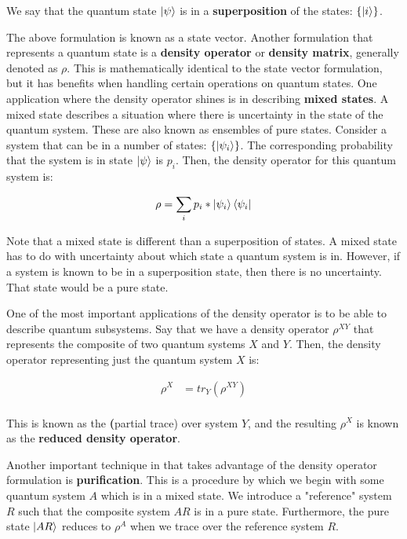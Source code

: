 We say that the quantum state $\ket{\psi}$ is in a \textbf{superposition} of the states: $\{\ket{i}\}$.


The above formulation is known as a state vector. Another formulation that represents a quantum state is a \textbf{density operator} or \textbf{density matrix}, generally denoted as $\rho$. This is mathematically identical to the state vector formulation, but it has benefits when handling certain operations on quantum states. 
One application where the density operator shines is in describing \textbf{mixed states}. A mixed state describes a situation where there is uncertainty in the state of the quantum system. These are also known as ensembles of pure states. Consider a system that can be in a number of states: $\{\ket{\psi_i}\}$. The corresponding probability that the system is in state $\ket{\psi}$ is $p_i$. Then, the density operator for this quantum system is:

\begin{align*}
    \rho &= \sum_{i} p_i * \ket{\psi_i}\bra{\psi_i} \\ 
\end{align*}

Note that a mixed state is different than a superposition of states. A mixed state has to do with uncertainty about which state a quantum system is in. However, if a system is known to be in a superposition state, then there is no uncertainty. That state would be a pure state.

One of the most important applications of the density operator is to be able to describe quantum subsystems. Say that we have a density operator $\rho^{XY}$ that represents the composite of two quantum systems $X$ and $Y$. Then, the density operator representing just the quantum system $X$ is:

\begin{align*}
    \rho^X &= tr_Y(\rho^{XY}) \\ 
\end{align*}

This is known as the \textbf(partial trace) over system $Y$, and the resulting $\rho^X$ is known as the \textbf{reduced density operator}.

Another important technique in that takes advantage of the density operator formulation is \textbf{purification}. This is a procedure by which we begin with some quantum system $A$ which is in a mixed state. We introduce a "reference" system $R$ such that the composite system $AR$ is in a pure state. Furthermore, the pure state $\ket{AR}$ reduces to $\rho^A$ when we trace over the reference system $R$.

